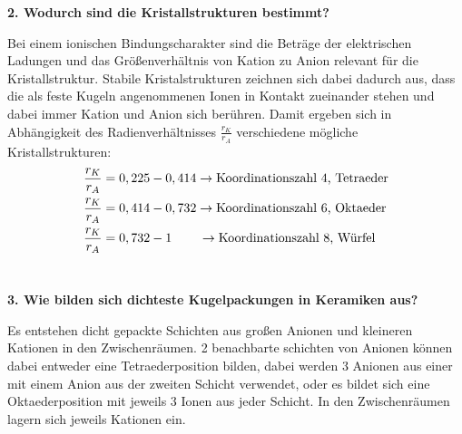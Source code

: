 \noindent\textbf{2. Wodurch sind die Kristallstrukturen bestimmt?}\\
\begin{addmargin}[25pt]{0pt}
Bei einem ionischen Bindungscharakter sind die Beträge der elektrischen Ladungen und das Größenverhältnis von Kation zu Anion relevant für die Kristallstruktur. Stabile Kristalstrukturen zeichnen sich dabei dadurch aus, dass die als feste Kugeln angenommenen Ionen in Kontakt zueinander stehen und dabei immer Kation und Anion sich berühren. Damit ergeben sich in Abhängigkeit des Radienverhältnisses $\frac{r_K}{r_A}$ verschiedene mögliche Kristallstrukturen:
\begin{align*}
    \frac{r_K}{r_A} &= 0,225-0,414 \rightarrow \text{Koordinationszahl 4, Tetraeder}\\
    \frac{r_K}{r_A} &= 0,414-0,732 \rightarrow \text{Koordinationszahl 6, Oktaeder}\\
    \frac{r_K}{r_A} &= 0,732-1     \hspace{0.75cm}\rightarrow \text{Koordinationszahl 8, Würfel}
\end{align*}\\
\end{addmargin}

\noindent\textbf{3. Wie bilden sich dichteste Kugelpackungen in Keramiken aus?}\\
\begin{addmargin}[25pt]{0pt}
Es entstehen dicht gepackte Schichten aus großen Anionen und kleineren Kationen in den Zwischenräumen. 2 benachbarte schichten von Anionen können dabei entweder eine Tetraederposition bilden, dabei werden 3 Anionen aus einer mit einem Anion aus der zweiten Schicht verwendet, oder es bildet sich eine Oktaederposition mit jeweils 3 Ionen aus jeder Schicht. In den Zwischenräumen lagern sich jeweils Kationen ein.  \\
\end{addmargin}

